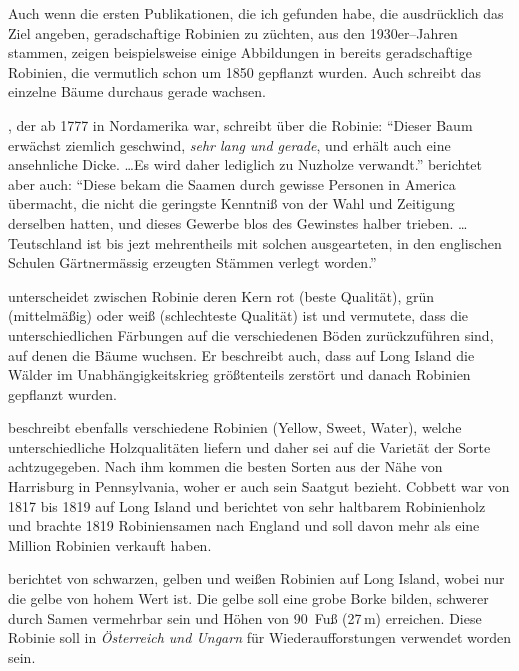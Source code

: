 \documentclass[twocolumn]{scrartcl}
\begin{document}
Auch wenn die ersten Publikationen, die ich gefunden habe, die
ausdrücklich das Ziel angeben, geradschaftige Robinien zu züchten, aus
den 1930er--Jahren stammen, zeigen beispielsweise einige Abbildungen
in \citet{vadas1911robinie} bereits geradschaftige Robinien, die
vermutlich schon um 1850 gepflanzt wurden. Auch
\cite{gaskil1906robinie} schreibt das einzelne Bäume durchaus gerade
wachsen.

\citet[S.~67]{wangenheim1781nordamericanischeHolzarten}, der ab 1777
in Nordamerika war, schreibt über die Robinie: \enquote{Dieser Baum
  erwächst ziemlich geschwind, \emph{sehr lang und gerade}, und erhält
  auch eine ansehnliche Dicke. \dots Es wird daher lediglich zu Nuzholze
  verwandt.}
\citet[S.~22--23]{wangenheim1781nordamericanischeHolzarten} berichtet
aber auch: \enquote{Diese bekam die Saamen durch gewisse Personen in
  America übermacht, die nicht die geringste Kenntniß von der Wahl und
  Zeitigung derselben hatten, und dieses Gewerbe blos des Gewinstes
  halber trieben. \dots Teutschland ist bis jezt mehrentheils mit
  solchen ausgearteten, in den englischen Schulen Gärtnermässig
  erzeugten Stämmen verlegt worden.}

\citet[S.~249]{Michaux1813arbres} unterscheidet
zwischen Robinie deren Kern rot (beste Qualität), grün (mittelmäßig)
oder weiß (schlechteste Qualität) ist und vermutete, dass die unterschiedlichen
Färbungen auf die verschiedenen Böden zurückzuführen sind, auf denen die Bäume wuchsen.
Er beschreibt auch, dass auf Long
Island die Wälder im Unabhängigkeitskrieg größtenteils zerstört und
danach Robinien gepflanzt wurden.

\citet{cobbett1825woodlands}
beschreibt ebenfalls verschiedene Robinien (Yellow, Sweet, Water),
welche unterschiedliche Holzqualitäten liefern und daher sei auf die
Varietät der Sorte achtzugegeben. Nach ihm kommen die besten
Sorten aus der Nähe von Harrisburg in Pennsylvania, woher er auch
sein Saatgut bezieht. Cobbett war von 1817 bis 1819 auf Long Island
und berichtet von sehr haltbarem Robinienholz und brachte 1819
Robiniensamen nach England und soll davon mehr als eine Million
Robinien verkauft haben.

\citet{hicks1883robinie} berichtet von
schwarzen, gelben und weißen Robinien auf Long Island, wobei nur die
gelbe von hohem Wert ist. Die gelbe soll eine grobe Borke bilden,
schwerer durch Samen vermehrbar sein und Höhen von 90~Fuß (27\,m)
erreichen. Diese Robinie soll in \emph{Österreich und Ungarn} für
Wiederaufforstungen verwendet worden sein.
\end{document}
